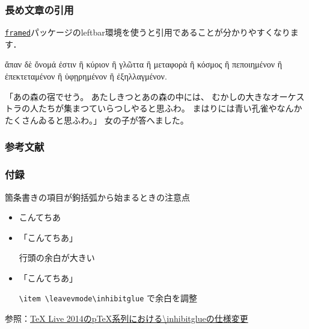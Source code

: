 \documentclass[12pt,unicode]{beamer}
\newenvironment{quoteblock}{%
    \def\FrameCommand{%
        {\color{sLightGray}{\vrule width 3pt}}%
        \hspace{10pt}
    }%
    \MakeFramed {\advance\hsize-\width \FrameRestore}}%
{\endMakeFramed}
\renewcommand\appendixname{付録}
\begin{document}
\begin{frame}
    \frametitle{長め文章の引用}
    \href{https://ctan.org/pkg/framed}{\texttt{framed}}パッケージのleftbar環境を使うと引用であることが分かりやすくなります．

    \begin{quoteblock}
ἅπαν δὲ ὄνομά ἐστιν ἢ κύριον ἢ γλῶττα ἢ μεταφορὰ ἢ κόσμος ἢ πεποιημένον ἢ ἐπεκτεταμένον ἢ ὑφῃρημένον ἢ ἐξηλλαγμένον.

\hfill {}
    \end{quoteblock}

    \begin{quoteblock}
        「あの森の宿でせう。
        あたしきつとあの森の中には、
        むかしの大きなオーケストラの人たちが集まつていらつしやると思ふわ。
        まはりには青い孔雀やなんかたくさんゐると思ふわ。」
        女の子が答へました。

        \hfill {}
    \end{quoteblock}
\end{frame}

\begin{frame}
\frametitle{参考文献}
\footnotesize


\end{frame}

\appendix
\begin{frame}
    \footnotesize
    \frametitle{\appendixname}
    箇条書きの項目が鉤括弧から始まるときの注意点
    \begin{itemize}
        \item こんてちあ
        \item 「こんてちあ」

            行頭の余白が大きい
        \item \leavevmode\inhibitglue 「こんてちあ」

            \texttt{\textbackslash item \textbackslash leavevmode\textbackslash inhibitglue} で余白を調整
    \end{itemize}

    \bigskip

    参照：\href{http://doratex.hatenablog.jp/entry/20140714/1405302796}{TeX Live 2014のpTeX系列における\textbackslash inhibitglueの仕様変更}
\end{frame}
\end{document}
